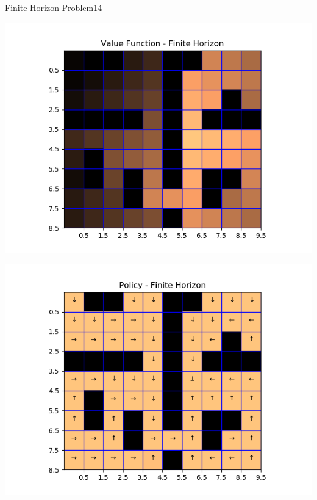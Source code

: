 \begin{questions}
\begin{question}{Finite Horizon Problem}{14}
\begin{answer}
\noindent\begin{minipage}{.5\textwidth}
	\centering
	\includegraphics[width=1\textwidth]{img/value_2a.png} 
	\label{fig:2a1}            
\end{minipage}%
\begin{minipage}{.5\textwidth}
	\centering
	\includegraphics[width=1\textwidth]{img/policy_2a.png} 
	\label{fig:2a2}               
\end{minipage}
\begin{minipage}{.5\textwidth}
	\centering

\end{minipage}
\end{answer}
\end{question}
\end{questions}
